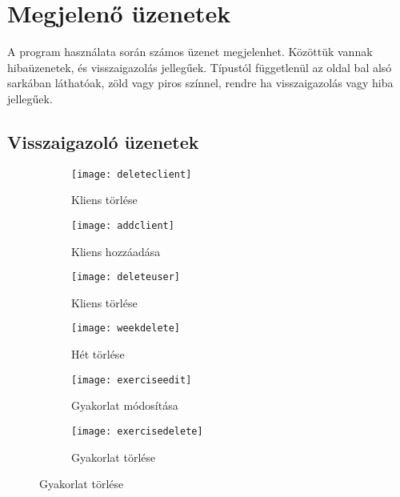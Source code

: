 \pagebreak

\section{Megjelenő üzenetek}

A program használata során számos üzenet megjelenhet. Közöttük vannak hibaüzenetek, és visszaigazolás jellegűek. Típustól függetlenül az oldal bal alsó sarkában láthatóak, zöld vagy piros színnel, rendre ha visszaigazolás vagy hiba jellegűek.

\subsection{Visszaigazoló üzenetek}

\begin{figure}[htbp]
	\centering
	\begin{subfigure}[b]{0.3\textwidth}
			\centering
			\texttt{[image: deleteclient]}
			\caption{Kliens törlése}
			\label{fig:deleteclient}
	\end{subfigure}
	\hfill
	\begin{subfigure}[b]{0.3\textwidth}
			\centering
			\texttt{[image: addclient]}
			\caption{Kliens hozzáadása}
			\label{fig:addclient}
	\end{subfigure}
	\hfill
	\begin{subfigure}[b]{0.3\textwidth}
			\centering
			\texttt{[image: deleteuser]}
			\caption{Kliens törlése}
			\label{fig:deleteuser}
	\end{subfigure}
	
	\medskip
	
	\begin{subfigure}[b]{0.3\textwidth}
			\centering
			\texttt{[image: weekdelete]}
			\caption{Hét törlése}
			\label{fig:weekdelete}
	\end{subfigure}
	\hfill
	\begin{subfigure}[b]{0.3\textwidth}
			\centering
			\texttt{[image: exerciseedit]}
			\caption{Gyakorlat módosítása}
			\label{fig:exerciseedit}
	\end{subfigure}
	\hfill
	\begin{subfigure}[b]{0.3\textwidth}
			\centering
			\texttt{[image: exercisedelete]}
			\caption{Gyakorlat törlése}
			\label{fig:exercisedelete}
	\end{subfigure}
	
	\medskip
	

\end{figure}
